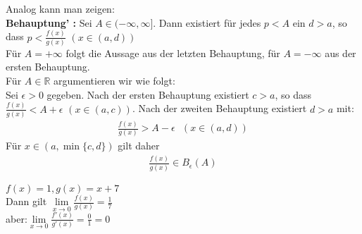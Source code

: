 \begin{Satz}
{\begin{itemize}
		Analog kann man zeigen: \\
		\textbf{Behauptung' :} Sei $A  \in (-\infty, \infty]$. Dann existiert für 
		jedes $p <A$ ein $d > a$, so dass $p < \frac{f(x)}{g(x)}$ $(x \in (a,d))$\\
		Für $A = +\infty$ folgt die Aussage aus der letzten Behauptung, für 
		$ A = - \infty$ aus der ersten Behauptung. \\
		Für $A \in \mathbb{R}$ argumentieren wir wie folgt: \\
		Sei $\epsilon > 0$ gegeben. Nach der ersten Behauptung existiert 
		$c > a$, so dass $\frac{f(x)}{g(x)} < A + \epsilon$ $(x\in (a,c))$. 
		Nach der zweiten Behauptung existiert $d > a$ mit:
		\begin{align*}
			\frac{f(x)}{g(x)} > A - \epsilon \text{ } (x \in (a,d))
		\end{align*}
		Für $x \in (a, \min\{c,d\})$ gilt daher
		\begin{align*}
			\frac{f(x)}{g(x)} \in B_{\epsilon}(A)
		\end{align*}
	\end{itemize}	
	
}\end{Satz}

\begin{Beispiel}{
	$f(x) = 1, g(x) = x + 7$\\
	Dann gilt $\lim\limits_{x \rightarrow 0 }{\frac{f(x)}{g(x)} = \frac{1}{7}}$ \\
 aber:$ \lim\limits_{x \rightarrow 0 }{\frac{f'(x)}{g'(x)} = \frac{0}{	1}= 0}$
}\end{Beispiel}
